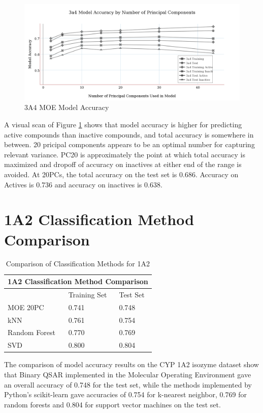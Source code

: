 \begin{figure}[H]
\includegraphics[width=1\textwidth]{../img/3a4_moe_model_accuracy.png}
\caption{3A4 MOE Model Accuracy}
\label{fig:3a4}
\end{figure}

A visual scan of Figure \ref{fig:3a4} shows that model accuracy is higher for predicting active compounds than inactive compounds, and total accuracy is somewhere in between. 20 pricipal components appears to be an optimal number for capturing relevant variance.
PC20 is approximately the point at which total accuracy is maximized and dropoff of accuracy on inactives at either end of the range is avoided.
At 20PCs, the total accuracy on the test set is 0.686. Accuracy on Actives is 0.736 and accuracy on inactives is 0.638.


\section{1A2 Classification Method Comparison}

\begin{table}[H]
\caption{Comparison of Classification Methods for 1A2}
\centering
\begin{tabular}{|l|l|l|}
\hline
\multicolumn{3}{|c|}{1A2 Classification Method Comparison} \\ \hline
          & Training Set & Test Set \\ \hline
MOE 20PC  & 0.741        & 0.748    \\ \hline
kNN       & 0.761        & 0.754    \\ \hline
Random Forest & 0.770    & 0.769    \\ \hline
SVD       & 0.800        & 0.804    \\ \hline
\end{tabular}
\end{table}

The comparison of model accuracy results on the CYP 1A2 isozyme dataset show that Binary QSAR implemented in the Molecular Operating Environment gave an overall accuracy of 0.748 for the test set, while the methods implemented by Python's scikit-learn gave accuracies of 0.754 for k-nearest neighbor, 0.769 for random forests and 0.804 for support vector machines on the test set.

